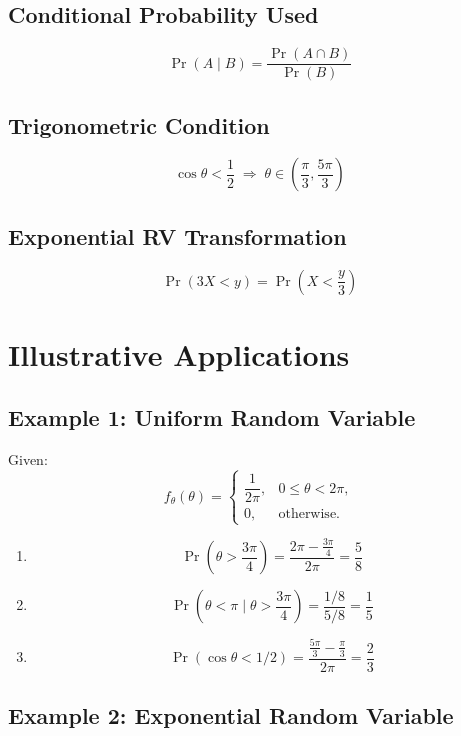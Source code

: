 \documentclass[12pt]{article}
\begin{document}
\subsection{Conditional Probability Used}
\[
\Pr(A \mid B)=\frac{\Pr(A \cap B)}{\Pr(B)}
\]

\subsection{Trigonometric Condition}
\[
\cos\theta < \frac{1}{2}
\;\Rightarrow\;
\theta \in \left(\frac{\pi}{3},\frac{5\pi}{3}\right)
\]

\subsection{Exponential RV Transformation}
\[
\Pr(3X<y)=\Pr\!\left(X<\frac{y}{3}\right)
\]

\newpage

\section{Illustrative Applications}

\subsection{Example 1: Uniform Random Variable}

Given:
\[
f_\theta(\theta)=
\begin{cases}
\dfrac{1}{2\pi}, & 0 \le \theta < 2\pi, \\
0, & \text{otherwise}.
\end{cases}
\]

\begin{enumerate}[label=(\alph*)]
    \item
    \[
    \Pr\!\left(\theta>\frac{3\pi}{4}\right)
    =\frac{2\pi-\frac{3\pi}{4}}{2\pi}
    =\frac{5}{8}
    \]

    \item
    \[
    \Pr\!\left(\theta<\pi \mid \theta>\frac{3\pi}{4}\right)
    =\frac{1/8}{5/8}
    =\frac{1}{5}
    \]

    \item
    \[
    \Pr(\cos\theta<1/2)
    =\frac{\frac{5\pi}{3}-\frac{\pi}{3}}{2\pi}
    =\frac{2}{3}
    \]
\end{enumerate}

\subsection{Example 2: Exponential Random Variable}
\end{document}

